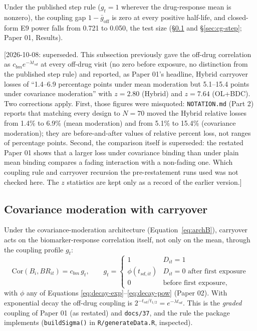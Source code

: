 \documentclass[11pt]{article}
\newcommand{\note}[1]{\textcolor{blue!60!black}{\small [#1]}}
\newcommand{\code}[1]{\texttt{#1}}
\begin{document}
Under the published step rule ($g_t = 1$ wherever the drug-response
mean is nonzero), the coupling gap $1 - \bar g_{\mathrm{off}}$ is zero
at every positive half-life, and closed-form E9 power falls from
0.721 to 0.050, the test size (\S\ref{sec:cov-carryover} and
\S\ref{sec:cg-step}; Paper 01, Results).

\note{2026-10-08: superseded. This subsection previously gave the
off-drug correlation as $c_{bm}e^{-\lambda t_{sd}}$ at every off-drug
visit (no zero before exposure, no distinction from the published step
rule) and reported, as Paper 01's headline, Hybrid carryover losses of
``1.4--6.9 percentage points under mean moderation but 5.1--15.4
points under covariance moderation'' with $z = 2.80$ (Hybrid) and
$z = 7.64$ (OL+BDC). Two corrections apply. First, those figures were
misquoted: \code{NOTATION.md} (Part 2) reports that matching every
design to $N = 70$ moved the Hybrid relative losses from 1.4\% to
6.9\% (mean moderation) and from 5.1\% to 15.4\% (covariance
moderation); they are before-and-after values of relative percent
loss, not ranges of percentage points. Second, the comparison itself
is superseded: the restated Paper 01 shows that a larger loss under
covariance binding than under plain mean binding compares a fading
interaction with a non-fading one. Which coupling rule and carryover
recursion the pre-restatement runs used was not checked here. The $z$
statistics are kept only as a record of the earlier version.}

\subsection{Covariance moderation with carryover}
\label{sec:cov-carryover}

Under the covariance-moderation architecture
(Equation~\eqref{eq:archB}), carryover acts
on the biomarker-response correlation itself, not only
on the mean, through the coupling profile $g_t$:
\begin{equation}
\mathrm{Cor}(B_i, BR_{it}) = c_{bm}\, g_t, \qquad
g_t = \begin{cases}
  1 & D_{it} = 1 \\
  \phi(t_{sd,it}) & D_{it} = 0 \text{ after first exposure} \\
  0 & \text{before first exposure},
\end{cases}
\label{eq:cor-carryover}
\end{equation}
with $\phi$ any of Equations \eqref{eq:decay-exp}--\eqref{eq:decay-pow}
(Paper 02). With exponential decay the off-drug coupling is
$2^{-t_{sd}/t_{1/2}} = e^{-\lambda t_{sd}}$. This is the \emph{graded}
coupling of Paper 01 (as restated) and \code{docs/37}, and the rule
the package implements (\code{buildSigma()} in \code{R/generateData.R},
inspected).
\end{document}
